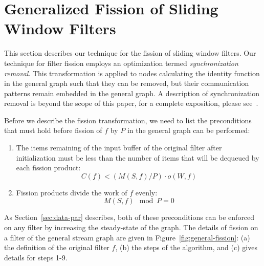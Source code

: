 \section{Generalized Fission of Sliding Window Filters}
\label{sec:fission}

This section describes our technique for the fission of sliding window
filters. Our technique for filter fission employs an optimization
termed {\it synchronization removal}.  This transformation is applied
to nodes calculating the identity function in the general graph such
that they can be removed, but their communication patterns remain
embedded in the general graph. A description of synchronization
removal is beyond the scope of this paper, for a complete exposition,
please see~\cite{mgordon-phd}.

Before we describe the fission transformation, we need to list the
preconditions that must hold before fission of $f$ by $P$ in the general
graph can be performed:

\begin{enumerate}
\item The items remaining of the input buffer of the original filter
  after initialization must be less than the number of items that will
  be dequeued by each fission product:
\begin{equation}
C(f) < (M(S,f) / P) \cdot o(W, f)
\label{eq:fiss-precond1}
\end{equation}

\item Fission products divide the work of $f$ evenly:
\begin{equation}
M(S,f) \mod P = 0 
\label{eq:mod-fiss}
\end{equation}
\end{enumerate}

\noindent As Section~\ref{sec:data-par} describes, both of these
preconditions can be enforced on any filter by increasing the
steady-state of the graph. The details of fission on a filter of the
general stream graph are given in Figure~\ref{fig:general-fission}:
(a) the definition of the original filter $f$, (b) the steps of the
algorithm, and (c) gives details for steps 1-9.


